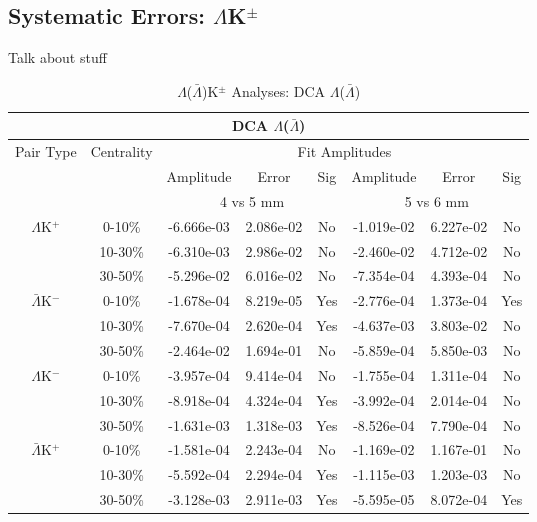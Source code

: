 \documentclass[../AnalysisNoteJBuxton.tex]{subfiles}
\begin{document}
\subsection{Systematic Errors: \texorpdfstring{$\Lambda$K$^{\pm}$}{TEXT}}
\label{SysErrsLamKch}

\clearpage

Talk about stuff

\begin{table}
 \centering
 \begin{tabular}{|c|c|c|c|c||c|c|c|}
  \multicolumn{8}{c}{DCA $\Lambda$($\bar{\Lambda}$)} \\
  \hline
  \multirow{3}{*}{Pair Type} & \multirow{3}{*}{Centrality} & \multicolumn{6}{c|}{Fit Amplitudes} \\
  \cline{3-8}
   & & Amplitude & Error & Sig & Amplitude & Error & Sig \\  
  \cline{3-8}
   & & \multicolumn{3}{c||}{4 vs 5 mm} & \multicolumn{3}{c|}{5 vs 6 mm} \\  
  \hline
  \multirow{3}{*}{$\Lambda$K$^{+}$}
   &  0-10\% & -6.666e-03 & 2.086e-02 & No & -1.019e-02 & 6.227e-02 & No \\
   & 10-30\% & -6.310e-03 & 2.986e-02 & No & -2.460e-02 & 4.712e-02 & No \\
   & 30-50\% & -5.296e-02 & 6.016e-02 & No & -7.354e-04 & 4.393e-04 & No \\
  \hline
  \multirow{3}{*}{$\bar{\Lambda}$K$^{-}$}
   &  0-10\% & -1.678e-04 & 8.219e-05 & Yes & -2.776e-04 & 1.373e-04 & Yes \\
   & 10-30\% & -7.670e-04 & 2.620e-04 & Yes & -4.637e-03 & 3.803e-02 & No \\
   & 30-50\% & -2.464e-02 & 1.694e-01 & No & -5.859e-04 & 5.850e-03 & No \\
  \hline \hline
  \multirow{3}{*}{$\Lambda$K$^{-}$}
   &  0-10\% & -3.957e-04 & 9.414e-04 & No & -1.755e-04 & 1.311e-04 & No \\
   & 10-30\% & -8.918e-04 & 4.324e-04 & Yes & -3.992e-04 & 2.014e-04 & No \\
   & 30-50\% & -1.631e-03 & 1.318e-03 & Yes & -8.526e-04 & 7.790e-04 & No \\
  \hline
  \multirow{3}{*}{$\bar{\Lambda}$K$^{+}$}
   &  0-10\% & -1.581e-04 & 2.243e-04 & No & -1.169e-02 & 1.167e-01 & No \\
   & 10-30\% &  -5.592e-04 & 2.294e-04 & Yes & -1.115e-03 & 1.203e-03 & No \\
   & 30-50\% & -3.128e-03 & 2.911e-03 & Yes & -5.595e-05 & 8.072e-04 & Yes \\
  \hline
 \end{tabular}
 \caption{$\Lambda$($\bar{\Lambda}$)K$^{\pm}$ Analyses: DCA $\Lambda$($\bar{\Lambda}$)}
 \label{tab:V0DcaLamKch}
\end{table}
\end{document}
